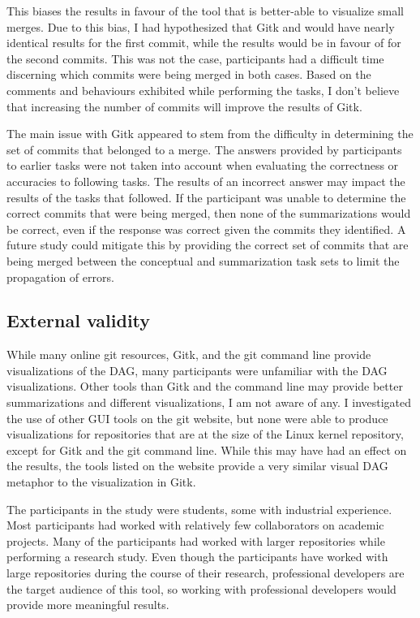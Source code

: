 This biases the results in favour of the tool that is better-able to
visualize small merges.
Due to this bias, I had hypothesized that Gitk and \tool{} would have
nearly identical results for the first commit, while the results would
be in favour of \tool{} for the second commits.
This was not the case, participants had a difficult time discerning
which commits were being merged in both cases.
Based on the comments and behaviours exhibited while performing the
tasks, I don't believe that increasing the number of commits will
improve the results of Gitk.

The main issue with Gitk appeared to stem from the difficulty in
determining the set of commits that belonged to a merge.
The answers provided by participants to earlier tasks were not taken
into account when evaluating the correctness or accuracies to following
tasks. The results of an incorrect answer may impact the results of the
tasks that followed. If the participant was unable to determine the
correct commits that were being merged, then none of the summarizations
would be correct, even if the response was correct given the commits
they identified. A future study could mitigate this by providing the
correct set of commits that are being merged between the conceptual and
summarization task sets to limit the propagation of errors.

\subsection{External validity}\label{sub:external_validity}

While many online git resources, Gitk, and the git command line provide
visualizations of the DAG, many participants were unfamiliar with the
DAG visualizations. Other tools than Gitk and the command line may
provide better summarizations and different visualizations, I am not
aware of any. I investigated the use of other GUI tools on the git
website, but none were able to produce visualizations for repositories
that are at the size of the Linux kernel repository, except for Gitk and
the git command line. While this may have had an effect on the results,
the tools listed on the website provide a very similar visual DAG
metaphor to the visualization in Gitk.

The participants in the study were students, some with industrial
experience. Most participants had worked with relatively few
collaborators on academic projects. Many of the participants had worked
with larger repositories while performing a research study. Even though
the participants have worked with large repositories during the course
of their research, professional developers are the target audience of
this tool, so working with professional developers would provide more
meaningful results.

